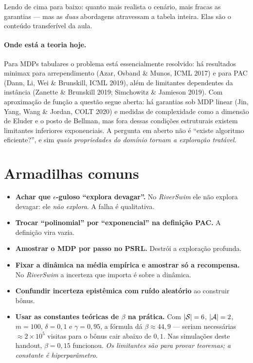 \documentclass[11pt, a4paper]{article}
\begin{document}
Lendo de cima para baixo: quanto mais realista o cenário, mais fracas as garantias --- mas
as \emph{duas} abordagens atravessam a tabela inteira. Elas são o conteúdo transferível
da aula.

\paragraph{Onde está a teoria hoje.} Para MDPs tabulares o problema está essencialmente
resolvido: há resultados minimax para arrependimento (Azar, Osband \& Munos, ICML 2017) e
para PAC (Dann, Li, Wei \& Brunskill, ICML 2019), além de limitantes dependentes da
instância (Zanette \& Brunskill 2019; Simchowitz \& Jamieson 2019). Com aproximação de
função a questão segue aberta: há garantias sob MDP linear (Jin, Yang, Wang \& Jordan,
COLT 2020) e medidas de complexidade como a dimensão de Eluder e o posto de Bellman, mas
fora dessas condições estruturais existem limitantes inferiores exponenciais. A pergunta
em aberto não é ``existe algoritmo eficiente?'', e sim \emph{quais propriedades do domínio
tornam a exploração tratável}.

\section{Armadilhas comuns}

\begin{itemize}
  \item \textbf{Achar que $\epsilon$-guloso ``explora devagar''.} No \textit{RiverSwim}
        ele não explora devagar: ele \emph{não explora}. A falha é qualitativa.
  \item \textbf{Trocar ``polinomial'' por ``exponencial'' na definição PAC.} A definição
        vira vazia.
  \item \textbf{Amostrar o MDP por passo no PSRL.} Destrói a exploração profunda.
  \item \textbf{Fixar a dinâmica na média empírica e amostrar só a recompensa.} No
        \textit{RiverSwim} a incerteza que importa é sobre a dinâmica.
  \item \textbf{Confundir incerteza epistêmica com ruído aleatório} ao construir bônus.
  \item \textbf{Usar as constantes teóricas de $\beta$ na prática.} Com $\lvert\mathcal{S}\rvert=6$,
        $\lvert\mathcal{A}\rvert=2$, $m=100$, $\delta=0{,}1$ e $\gamma=0{,}95$, a fórmula dá
        $\beta \approx 44{,}9$ --- seriam necessárias $\approx 2\times10^{5}$ visitas para
        o bônus cair abaixo de $0{,}1$. Nas simulações deste handout, $\beta = 0{,}15$
        funcionou. \emph{Os limitantes são para provar teoremas; a constante é
        hiperparâmetro.}
\end{itemize}
\end{document}
